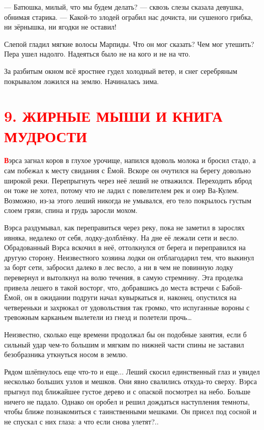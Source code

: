 \documentclass[oneside,final,14pt]{extreport}
\begin{document}
	— Батюшка, милый, что мы будем делать? — сквозь слезы сказала девушка, обнимая старика. — Какой-то злодей ограбил нас дочиста, ни сушеного грибка, ни зёрнышка, ни ягодки не оставил!
	
	Слепой гладил мягкие волосы Марпиды. Что он мог сказать? Чем мог утешить? Пера ушел надолго. Надеяться было не на кого и не на что.
	
	За разбитым окном всё яростнее гудел холодный ветер, и снег серебряным покрывалом ложился на землю. Начиналась зима.
	
	\section[9. Жирные мыши и Книга мудрости]{\center \textcolor{red}{9. ЖИРНЫЕ МЫШИ И КНИГА МУДРОСТИ}}
	
	
	\lettrine[findent=0pt]{\textbf{\textcolor{red}{В}}}{}эрса загнал коров в глухое урочище, напился вдоволь молока и бросил стадо, а сам побежал к месту свидания с Ёмой. Вскоре он очутился на берегу довольно широкой реки. Перепрыгнуть через неё леший не отважился. Переходить вброд он тоже не хотел, потому что не ладил с повелителем рек и озер Ва-Кулем. Возможно, из-за этого леший никогда не умывался, его тело покрылось густым слоем грязи, спина и грудь заросли мохом.
	
	Вэрса раздумывал, как переправиться через реку, пока не заметил в зарослях ивняка, недалеко от себя, лодку-долблёнку. На дне её лежали сети и весло. Обрадованный Вэрса вскочил в неё, оттолкнулся от берега и переправился на другую сторону. Неизвестного хозяина лодки он отблагодарил тем, что выкинул за борт сети, забросил далеко в лес весло, а ни в чем не повинную лодку перевернул и вытолкнул на волю течения, в самую стремнину. Эта проделка привела лешего в такой восторг, что, добравшись до места встречи с Бабой-Ёмой, он в ожидании подруги начал кувыркаться и, наконец, опустился на четвереньки и захрюкал от удовольствия так громко, что испуганные вороны с тревожным карканьем вылетели из гнезд и полетели прочь…
	
	Неизвестно, сколько еще времени продолжал бы он подобные занятия, если б сильный удар чем-то большим и мягким по нижней части спины не заставил безобразника уткнуться носом в землю.
	
	Рядом шлёпнулось еще что-то и еще... Леший скосил единственный глаз и увидел несколько больших узлов и мешков. Они явно свалились откуда-то сверху. Вэрса прыгнул под ближайшее густое дерево и с опаской посмотрел на небо. Больше ничего не падало. Однако он оробел и решил дождаться наступления темноты, чтобы ближе познакомиться с таинственными мешками. Он присел под сосной и не спускал с них глаза: а что если снова улетят?..
	
\end{document}
